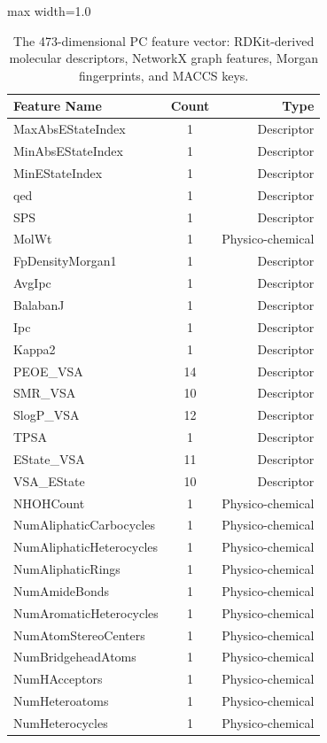 \documentclass[9pt,a4paper]{article}
\begin{document}
\begin{table}[h]
\centering
\caption{The 473-dimensional PC feature vector: RDKit-derived molecular descriptors,
NetworkX graph features, Morgan fingerprints, and MACCS keys.}
\label{tab:s1_pc_features}
\tiny
\begin{adjustbox}{max width=1.0\linewidth}
\begin{tabular}{|l|c|r|}
\toprule
\textbf{Feature Name} & \textbf{Count} & \textbf{Type} \\
\midrule
MaxAbsEStateIndex & 1 & Descriptor \\
MinAbsEStateIndex & 1 & Descriptor \\
MinEStateIndex & 1 & Descriptor \\
qed & 1 & Descriptor \\
SPS & 1 & Descriptor \\
MolWt & 1 & Physico-chemical \\
FpDensityMorgan1 & 1 & Descriptor \\
AvgIpc & 1 & Descriptor \\
BalabanJ & 1 & Descriptor \\
Ipc & 1 & Descriptor \\
Kappa2 & 1 & Descriptor \\
PEOE\_VSA & 14 & Descriptor \\
SMR\_VSA & 10 & Descriptor \\
SlogP\_VSA & 12 & Descriptor \\
TPSA & 1 & Descriptor \\
EState\_VSA & 11 & Descriptor \\
VSA\_EState & 10 & Descriptor \\
NHOHCount & 1 & Physico-chemical \\
NumAliphaticCarbocycles & 1 & Physico-chemical \\
NumAliphaticHeterocycles & 1 & Physico-chemical \\
NumAliphaticRings & 1 & Physico-chemical \\
NumAmideBonds & 1 & Physico-chemical \\
NumAromaticHeterocycles & 1 & Physico-chemical \\
NumAtomStereoCenters & 1 & Physico-chemical \\
NumBridgeheadAtoms & 1 & Physico-chemical \\
NumHAcceptors & 1 & Physico-chemical \\
NumHeteroatoms & 1 & Physico-chemical \\
NumHeterocycles & 1 & Physico-chemical \\

\end{tabular}
\end{adjustbox}
\end{table}
\end{document}
